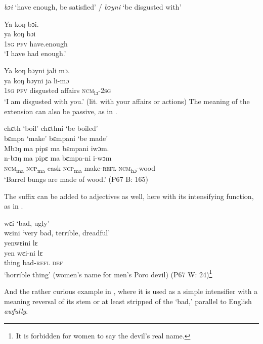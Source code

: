 \ex \textit{bɔi} ‘have enough, be satisfied' / \textit{bɔyni} ‘be disgusted with'

\ea Ya koŋ bɔi.\\
\gll ya    koŋ  bɔi\\
\textsc{1sg}  \textsc{pfv}  have.enough\\
\glt ‘I have had enough.'

\ex Ya koŋ bɔyni jali mɔ.\\
  \gll ya    koŋ  bɔyni      ja      li-mɔ\\
  \textsc{1sg}  \textsc{pfv}  disgusted  affairs  \textsc{ncm}\textsubscript{lɔ}{}-\textsc{2sg}\\
  \glt ‘I am disgusted with you.' (lit. with your affairs or actions)
\z
\z
\z
The meaning of the extension can also be passive, as in .

  \ea%
  \label{ex:162}
  \ea chɛth \tab ‘boil' \tab chɛthni \tab ‘be boiled'\\
  bɛmpa \tab ‘make' \tab bɛmpani \tab ‘be made'\\
  
  \ex Mbɔŋ ma pipɛ ma bɛmpani iwɔm.\\
  \gll n-bɔŋ    ma    pipɛ  ma    bɛmpa-ni  i-wɔm\\
  \textsc{ncm}\textsubscript{ma}  \textsc{ncp}\textsubscript{ma}    cask  \textsc{ncp}\textsubscript{ma}     make-\textsc{refl}  \textsc{ncm}\textsubscript{hɔ}{}-wood\\
  \glt ‘Barrel bungs are made of wood.' (P67 B: 165)
\z
\z

\noindent The suffix can be added to adjectives as well, here with its intensifying function, as in .

\ea%
  \label{ex:163}
  \ea wɛi \tab ‘bad, ugly'\\
  wɛini \tab ‘very bad, terrible, dreadful'\\
  \vspace{6pt}
  \ex yenwɛini lɛ\\
  \gll yen    wɛi-ni     lɛ\\
  thing    bad-\textsc{refl}  \textsc{def}\\
  \glt ‘horrible thing' (women's name for men's Poro devil) (P67 W: 24)\footnote{It is forbidden for women to say the devil's real name.}
\z
\z

And the rather curious example in , where it is used as a simple intensifier with a meaning reversal of its stem or at least stripped of the ‘bad,' parallel to English \textit{awfully}.

